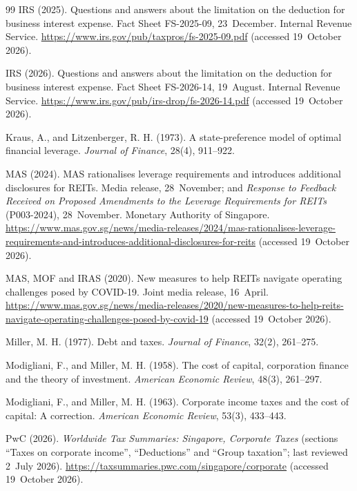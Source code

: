 \begin{thebibliography}{99}
IRS (2025). Questions and answers about the limitation on the deduction for business interest expense. Fact Sheet FS-2025-09, 23~December. Internal Revenue Service. \url{https://www.irs.gov/pub/taxpros/fs-2025-09.pdf} (accessed 19~October 2026).

IRS (2026). Questions and answers about the limitation on the deduction for business interest expense. Fact Sheet FS-2026-14, 19~August. Internal Revenue Service. \url{https://www.irs.gov/pub/irs-drop/fs-2026-14.pdf} (accessed 19~October 2026).

Kraus, A., and Litzenberger, R. H. (1973). A state-preference model of optimal financial leverage. \textit{Journal of Finance}, 28(4), 911--922.

MAS (2024). MAS rationalises leverage requirements and introduces additional disclosures for REITs. Media release, 28~November; and \textit{Response to Feedback Received on Proposed Amendments to the Leverage Requirements for REITs} (P003-2024), 28~November. Monetary Authority of Singapore. \url{https://www.mas.gov.sg/news/media-releases/2024/mas-rationalises-leverage-requirements-and-introduces-additional-disclosures-for-reits} (accessed 19~October 2026).

MAS, MOF and IRAS (2020). New measures to help REITs navigate operating challenges posed by COVID-19. Joint media release, 16~April. \url{https://www.mas.gov.sg/news/media-releases/2020/new-measures-to-help-reits-navigate-operating-challenges-posed-by-covid-19} (accessed 19~October 2026).

Miller, M. H. (1977). Debt and taxes. \textit{Journal of Finance}, 32(2), 261--275.

Modigliani, F., and Miller, M. H. (1958). The cost of capital, corporation finance and the theory of investment. \textit{American Economic Review}, 48(3), 261--297.

Modigliani, F., and Miller, M. H. (1963). Corporate income taxes and the cost of capital: A correction. \textit{American Economic Review}, 53(3), 433--443.

PwC (2026). \textit{Worldwide Tax Summaries: Singapore, Corporate Taxes} (sections ``Taxes on corporate income'', ``Deductions'' and ``Group taxation''; last reviewed 2~July 2026). \url{https://taxsummaries.pwc.com/singapore/corporate} (accessed 19~October 2026).


\end{thebibliography}
